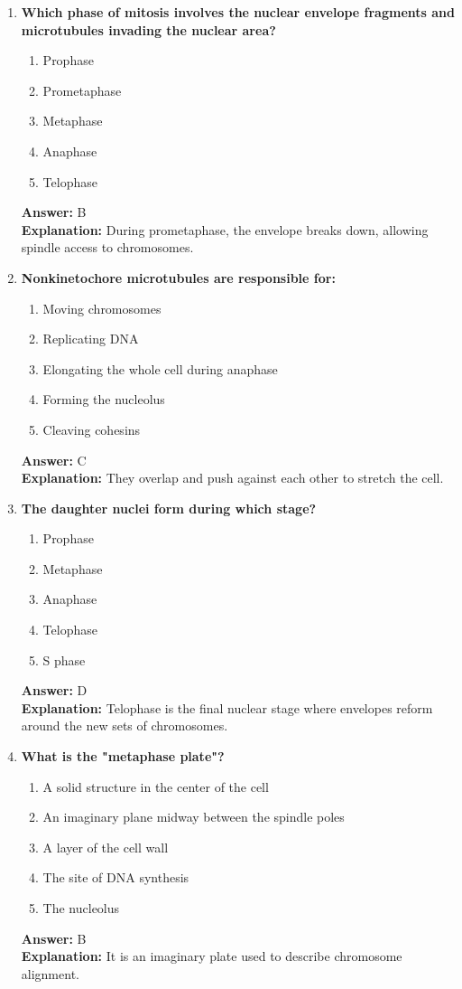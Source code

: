 \documentclass[11pt, a4paper]{article}
\begin{document}
\begin{enumerate}[leftmargin=*, label=\arabic*.]
\item \textbf{Which phase of mitosis involves the nuclear envelope fragments and microtubules invading the nuclear area?}
\begin{enumerate}[label=\Alph*.]
\item Prophase
\item Prometaphase
\item Metaphase
\item Anaphase
\item Telophase
\end{enumerate}
\textbf{Answer:} B \\
\textbf{Explanation:} During prometaphase, the envelope breaks down, allowing spindle access to chromosomes.

\item \textbf{Nonkinetochore microtubules are responsible for:}
\begin{enumerate}[label=\Alph*.]
\item Moving chromosomes
\item Replicating DNA
\item Elongating the whole cell during anaphase
\item Forming the nucleolus
\item Cleaving cohesins
\end{enumerate}
\textbf{Answer:} C \\
\textbf{Explanation:} They overlap and push against each other to stretch the cell.

\item \textbf{The daughter nuclei form during which stage?}
\begin{enumerate}[label=\Alph*.]
\item Prophase
\item Metaphase
\item Anaphase
\item Telophase
\item S phase
\end{enumerate}
\textbf{Answer:} D \\
\textbf{Explanation:} Telophase is the final nuclear stage where envelopes reform around the new sets of chromosomes.

\item \textbf{What is the "metaphase plate"?}
\begin{enumerate}[label=\Alph*.]
\item A solid structure in the center of the cell
\item An imaginary plane midway between the spindle poles
\item A layer of the cell wall
\item The site of DNA synthesis
\item The nucleolus
\end{enumerate}
\textbf{Answer:} B \\
\textbf{Explanation:} It is an imaginary plate used to describe chromosome alignment.


\end{enumerate}
\end{document}
